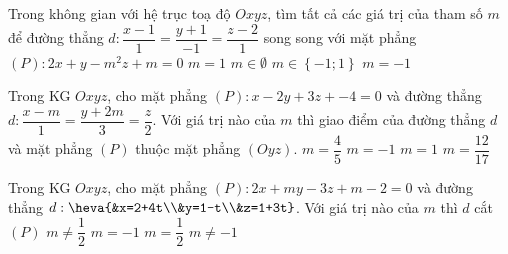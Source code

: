 \begin{ex}%
Trong không gian với hệ trục toạ độ $Oxyz$, tìm tất cả các giá trị của tham số $m$ để đường thẳng $d:\dfrac{x-1}{1}=\dfrac{y+1}{-1}=\dfrac{z-2}{1}$ song song với mặt phẳng $(P):2x+y-m^2z+m=0$
\choice
{$m=1$}
{$m\in\emptyset$}
{$m\in\left\{-1;1\right\}$}
{\True $m=-1$}
\end{ex}

\begin{ex}%
Trong KG $Oxyz$, cho mặt phẳng $(P):x-2y+3z+-4=0$ và đường thẳng $d: \dfrac{x-m}{1}=\dfrac{y+2m}{3}=\dfrac{z}{2}$. Với giá trị nào của $m$ thì giao điểm của đường thẳng $d$ và mặt phẳng $(P)$ thuộc mặt phẳng $(Oyz)$.
\choice
{$m=\dfrac{4}{5}$}
{$m=-1$}
{\True $m=1$}
{$m=\dfrac{12}{17}$}
\end{ex}

\begin{ex}%
Trong KG $Oxyz$, cho mặt phẳng $(P):2x+my-3z+m-2=0$ và đường thẳng $d:\heva{&x=2+4t\\&y=1-t\\&z=1+3t}$. Với giá trị nào của $m$ thì $d$ cắt $(P)$
\choice
{$m\neq\dfrac{1}{2}$}
{$m=-1$}
{$m=\dfrac{1}{2}$}
{\True $m\neq -1$}
\end{ex}

